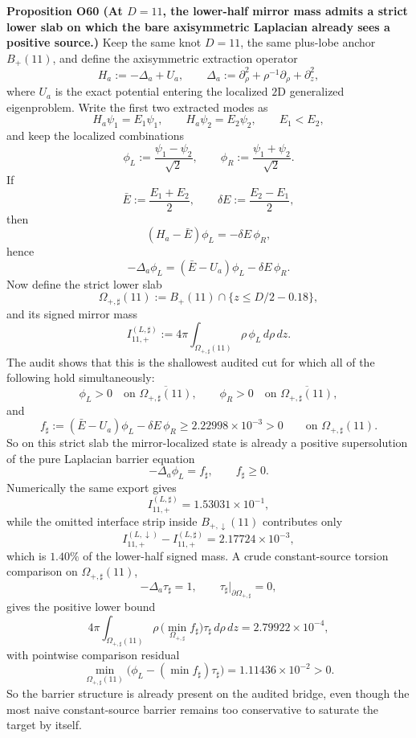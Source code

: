 \documentclass[aps,prd,onecolumn,notitlepage,nofootinbib,superscriptaddress,11pt,floatfix]{revtex4-2}
\begin{document}
\medskip\noindent\textbf{Proposition O60 (At \(D=11\), the lower-half mirror mass admits a strict lower slab on which the bare axisymmetric Laplacian already sees a positive source.)}
Keep the same knot \(D=11\), the same plus-lobe anchor \(B_+(11)\), and define the axisymmetric extraction operator
\[
H_a:=-\Delta_a+U_a,
\qquad
\Delta_a:=\partial_\rho^2+\rho^{-1}\partial_\rho+\partial_z^2,
\]
where \(U_a\) is the exact potential entering the localized \(2\)D generalized eigenproblem.  Write the first two extracted modes as
\[
H_a\psi_1=E_1\psi_1,
\qquad
H_a\psi_2=E_2\psi_2,
\qquad
E_1<E_2,
\]
and keep the localized combinations
\[
\phi_L:=\frac{\psi_1-\psi_2}{\sqrt2},
\qquad
\phi_R:=\frac{\psi_1+\psi_2}{\sqrt2}.
\]
If
\[
\bar E:=\frac{E_1+E_2}{2},
\qquad
\delta E:=\frac{E_2-E_1}{2},
\]
then
\[
(H_a-\bar E)\phi_L=-\delta E\,\phi_R,
\]
hence
\[
-\Delta_a\phi_L
=
(\bar E-U_a)\phi_L-\delta E\,\phi_R.
\]
Now define the strict lower slab
\[
\Omega_{+,\sharp}(11)
:=
B_+(11)\cap\{z\le D/2-0.18\},
\]
and its signed mirror mass
\[
I_{11,+}^{(L,\sharp)}
:=
4\pi\int_{\Omega_{+,\sharp}(11)} \rho\,\phi_L\,d\rho\,dz.
\]
The audit
shows that this is the shallowest audited cut for which all of the following hold simultaneously:
\[
\phi_L>0\quad\text{on }\overline{\Omega_{+,\sharp}(11)},
\qquad
\phi_R>0\quad\text{on }\overline{\Omega_{+,\sharp}(11)},
\]
and
\[
f_\sharp:=(\bar E-U_a)\phi_L-\delta E\,\phi_R\ge 2.22998\times10^{-3}>0
\qquad\text{on }\Omega_{+,\sharp}(11).
\]
So on this strict slab the mirror-localized state is already a positive supersolution of the pure Laplacian barrier equation
\[
-\Delta_a\phi_L=f_\sharp,\qquad f_\sharp\ge 0.
\]
Numerically the same export gives
\[
I_{11,+}^{(L,\sharp)}=1.53031\times10^{-1},
\]
while the omitted interface strip inside \(B_{+,\downarrow}(11)\) contributes only
\[
I_{11,+}^{(L,\downarrow)}-I_{11,+}^{(L,\sharp)}
=
2.17724\times10^{-3},
\]
which is \(1.40\%\) of the lower-half signed mass.  A crude constant-source torsion comparison on \(\Omega_{+,\sharp}(11)\),
\[
-\Delta_a\tau_\sharp=1,\qquad \tau_\sharp|_{\partial\Omega_{+,\sharp}}=0,
\]
gives the positive lower bound
\[
4\pi\int_{\Omega_{+,\sharp}(11)} \rho\,\bigl(\min_{\Omega_{+,\sharp}} f_\sharp\bigr)\tau_\sharp\,d\rho\,dz
=
2.79922\times10^{-4},
\]
with pointwise comparison residual
\[
\min_{\Omega_{+,\sharp}(11)}\bigl(\phi_L-(\min f_\sharp)\tau_\sharp\bigr)
=
1.11436\times10^{-2}>0.
\]
So the barrier structure is already present on the audited bridge, even though the most naive constant-source barrier remains too conservative to saturate the target by itself.
\end{document}
